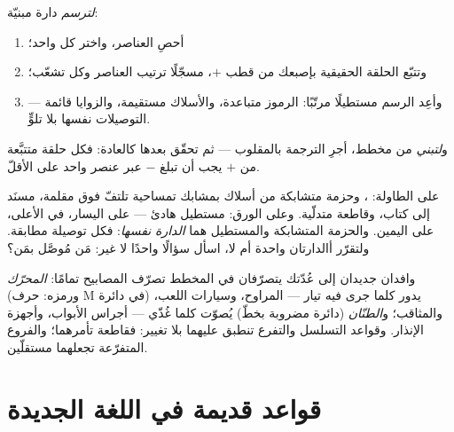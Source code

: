 \begin{method}\label{met:g6:circuits-and-safety:translate}
\emph{لترسم} دارة مبنيّة:
\begin{enumerate}
  \item أحصِ العناصر، واختر  كل واحد؛
  \item وتتبّع الحلقة الحقيقية بإصبعك من قطب  $+$،
        مسجّلًا ترتيب العناصر وكل تشعّب؛
  \item وأعِد الرسم مستطيلًا مرتّبًا: الرموز متباعدة، والأسلاك
        مستقيمة، والزوايا قائمة --- التوصيلات نفسها بلا
        تلوٍّ.
\end{enumerate}
و\emph{لتبني} من مخطط، أجرِ الترجمة بالمقلوب --- ثم تحقّق بعدها
كالعادة: فكل حلقة متتبَّعة من $+$ يجب أن تبلغ $-$ عبر عنصر واحد
على الأقلّ.
\end{method}

\begin{example}\label{ex:g6:circuits-and-safety:portraits}
على الطاولة: ، وحزمة متشابكة من أسلاك بمشابك تمساحية
تلتفّ فوق مقلمة،  مسنَد إلى كتاب، وقاطعة متدلّية. وعلى
الورق: مستطيل هادئ ---  على اليسار،  في الأعلى،
 على اليمين. والحزمة المتشابكة والمستطيل هما \emph{الدارة
نفسها}: فكل توصيلة مطابقة. ولتقرّر أالدارتان واحدة أم لا، اسأل
سؤالًا واحدًا لا غير: مَن مُوصَّل بمَن؟
\end{example}

\begin{example}\label{ex:g6:circuits-and-safety:motor}
وافدان جديدان إلى عُدّتك يتصرّفان في المخطط تصرّف المصابيح
تمامًا: \emph{المحرّك} (ورمزه: حرف M في دائرة)
يدور كلما جرى فيه تيار --- المراوح، وسيارات اللعب، والمثاقب؛
و\emph{الطنّان} (دائرة مضروبة بخطّ) يُصوّت كلما
غُذّي --- أجراس الأبواب، وأجهزة الإنذار. وقواعد التسلسل والتفرع
تنطبق عليهما بلا تغيير: فقاطعة  تأمرهما؛ والفروع
المتفرّعة تجعلهما مستقلّين.
\end{example}

\section{قواعد قديمة في اللغة الجديدة}

